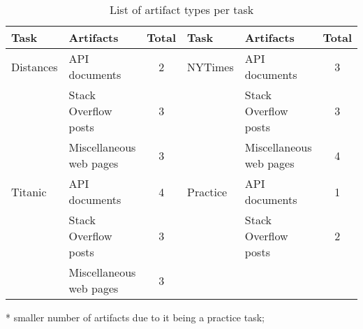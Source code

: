 


\begin{table}
\centering
\caption{List of artifact types per task}
\begin{scriptsize}
\begin{threeparttable}
\begin{tabular}{llcllc}
\hline
\textbf{Task} & \textbf{Artifacts} & \textbf{Total} & \textbf{Task} & \textbf{Artifacts} & \textbf{Total}                                                                              \\
\hline
\hline
%
%
\parbox[l][0.5cm][c]{1cm}{Distances}    & API documents             & 2  & \parbox[l][0.5cm][c]{1cm}{NYTimes}      & API documents             & 3 \\
\parbox[l][0.5cm][c]{1cm}{}             & Stack Overflow posts      & 3 & \parbox[l][0.5cm][c]{1cm}{}             & Stack Overflow posts      & 3 \\
\parbox[l][0.5cm][c]{1cm}{}             & Miscellaneous web pages   & 3 & \parbox[l][0.5cm][c]{1cm}{}             & Miscellaneous web pages   & 4 \\
\hline

\parbox[l][0.5cm][c]{1cm}{Titanic}      & API documents             & 4 & \parbox[l][0.5cm][c]{1cm}{Practice\tnote{*}}      & API documents             & 1 \\
\parbox[l][0.5cm][c]{1cm}{}             & Stack Overflow posts      & 3 & \parbox[l][0.5cm][c]{1cm}{}             & Stack Overflow posts      & 2 \\
\parbox[l][0.5cm][c]{1cm}{}             & Miscellaneous web pages   & 3 \\
\hline


\end{tabular}
\begin{tablenotes}
    \item[*] smaller number of artifacts due to it being a practice task;
\end{tablenotes}
\end{threeparttable}
\end{scriptsize}
\label{tbl:python-task-distribution}
\end{table}






